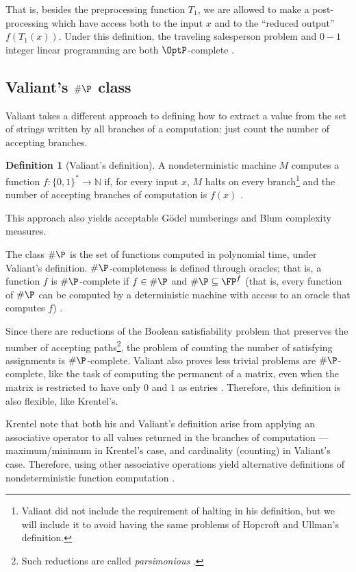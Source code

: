 \documentclass[12pt]{article}
\theoremstyle{definition}
\newtheorem{definition}{Definition}
\begin{document}
That is, besides the preprocessing function $T_1$,
we are allowed to make a post-processing which have access
both to the input $x$ and to the ``reduced output'' $f(T_1(x))$.
Under this definition,
the traveling salesperson problem and $0-1$ integer linear programming
are both $\OptP$-complete \cite[p~495]{Krentel1988}.

\subsection{Valiant's $\#\P$ class}
\label{sec:valiant}

Valiant takes a different approach to defining how to extract a value
from the set of strings written by all branches of a computation:
just count the number of accepting branches.

\begin{definition}[Valiant's definition]
    A nondeterministic machine $M$ computes a function $f: \{0, 1\}^* \to \mathbb N$ if,
    for every input $x$,
    $M$ halts on every branch\footnote{
        Valiant did not include the requirement of halting in his definition,
        but we will include it to avoid having the same problems
        of Hopcroft and Ullman's definition.
    }
    and the number of accepting branches of computation is $f(x)$
    \cite[p.~191]{Valiant1979}.
\end{definition}
This approach also yields acceptable Gödel numberings and Blum complexity measures.

The class $\#\P$ is the set of functions computed in polynomial time,
under Valiant's definition.
$\#\P$-completeness is defined through oracles;
that is, a function $f$ is $\#\P$-complete if $f \in \#\P$
and $\#\P \subseteq \FP^f$
(that is, every function of $\#\P$ can be computed by a deterministic machine
with access to an oracle that computes $f$)
\cite[p.~191]{Valiant1979}.

Since there are reductions of the Boolean satisfiability problem
that preserves the number of accepting paths\footnote{
    Such reductions are called \emph{parsimonious} \cite[p~346]{AroraBarak2009}.
},
the problem of counting the number of satisfying assignments is $\#\P$-complete.
Valiant also proves less trivial problems are $\#\P$-complete,
like the task of computing the permanent of a matrix,
even when the matrix is restricted to have only $0$ and $1$ as entries
\cite[p.~194]{Valiant1979}.
Therefore,
this definition is also flexible, like Krentel's.

Krentel note that both his and Valiant's definition
arise from applying an associative operator
to all values returned in the branches of computation
--- maximum/minimum in Krentel's case,
and cardinality (counting) in Valiant's case.
Therefore, using other associative operations yield alternative definitions
of nondeterministic function computation \cite[p.~493]{Krentel1988}.
\end{document}
